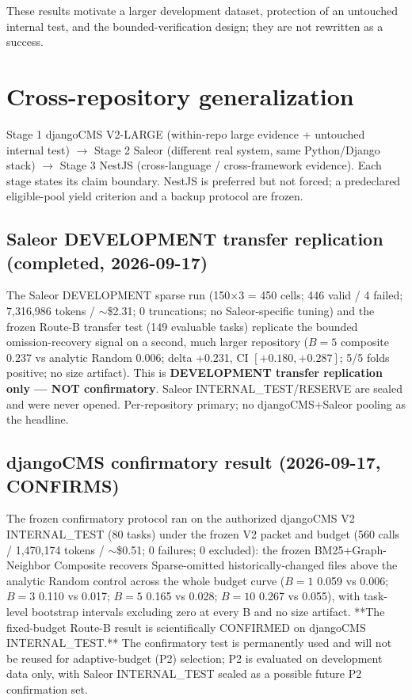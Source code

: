 \documentclass[11pt,a4paper]{article}
\begin{document}
These results motivate a larger development dataset, protection of an untouched
internal test, and the bounded-verification design; they are not rewritten as a
success.

\section{Cross-repository generalization}
\label{sec:gen}

Stage 1 djangoCMS V2-LARGE (within-repo large evidence + untouched internal
test) $\to$ Stage 2 Saleor (different real system, same Python/Django stack)
$\to$ Stage 3 NestJS (cross-language / cross-framework evidence). Each stage
states its claim boundary. NestJS is preferred but not forced; a predeclared
eligible-pool yield criterion and a backup protocol are frozen.

\subsection{Saleor DEVELOPMENT transfer replication (completed, 2026-09-17)}
The Saleor DEVELOPMENT sparse run (150$\times$3 = 450 cells; 446 valid / 4
failed; 7,316,986 tokens / $\sim$\$2.31; 0 truncations; no Saleor-specific
tuning) and the frozen Route-B transfer test (149 evaluable tasks) replicate
the bounded omission-recovery signal on a second, much larger repository
($B{=}5$ composite 0.237 vs analytic Random 0.006; delta +0.231, CI
$[+0.180,+0.287]$; 5/5 folds positive; no size artifact). This is
\textbf{DEVELOPMENT transfer replication only --- NOT confirmatory}. Saleor
INTERNAL\_TEST/RESERVE are sealed and were never opened. Per-repository primary;
no djangoCMS+Saleor pooling as the headline.

\subsection{djangoCMS confirmatory result (2026-09-17, CONFIRMS)}
The frozen confirmatory protocol ran on the authorized djangoCMS V2
INTERNAL\_TEST (80 tasks) under the frozen V2 packet and budget (560 calls /
1,470,174 tokens / $\sim$\$0.51; 0 failures; 0 excluded): the frozen
BM25+Graph-Neighbor Composite recovers Sparse-omitted historically-changed
files above the analytic Random control across the whole budget curve
($B{=}1$ 0.059 vs 0.006; $B{=}3$ 0.110 vs 0.017; $B{=}5$ 0.165 vs 0.028;
$B{=}10$ 0.267 vs 0.055), with task-level bootstrap intervals excluding zero
at every B and no size artifact. **The fixed-budget Route-B result is
scientifically CONFIRMED on djangoCMS INTERNAL\_TEST.** The confirmatory
test is permanently used and will not be reused for adaptive-budget (P2)
selection; P2 is evaluated on development data only, with Saleor
INTERNAL\_TEST sealed as a possible future P2 confirmation set.
\end{document}
